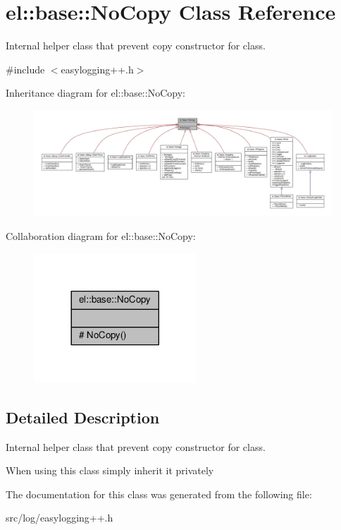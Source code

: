 \hypertarget{classel_1_1base_1_1NoCopy}{}\section{el\+:\+:base\+:\+:No\+Copy Class Reference}
\label{classel_1_1base_1_1NoCopy}


Internal helper class that prevent copy constructor for class.  




{\ttfamily \#include $<$easylogging++.\+h$>$}



Inheritance diagram for el\+:\+:base\+:\+:No\+Copy\+:
\nopagebreak
\begin{figure}[H]
\begin{center}
\leavevmode
\includegraphics[width=350pt]{d0/dd0/classel_1_1base_1_1NoCopy__inherit__graph}
\end{center}
\end{figure}


Collaboration diagram for el\+:\+:base\+:\+:No\+Copy\+:
\nopagebreak
\begin{figure}[H]
\begin{center}
\leavevmode
\includegraphics[width=173pt]{d9/d29/classel_1_1base_1_1NoCopy__coll__graph}
\end{center}
\end{figure}


\subsection{Detailed Description}
Internal helper class that prevent copy constructor for class. 

When using this class simply inherit it privately 

The documentation for this class was generated from the following file\+:\begin{DoxyCompactItemize}
\item 
src/log/easylogging++.\+h\end{DoxyCompactItemize}
